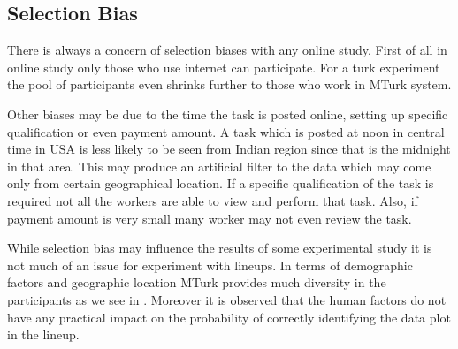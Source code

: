 \documentclass[11pt]{article}
\begin{document}

\subsection{Selection Bias} 


There is always a concern of selection biases with any online study. First of all in online study only those who use internet can participate. For a turk experiment the pool of participants even shrinks further to those who work in MTurk system. 

Other biases may be due to the time the task is posted online, setting up specific qualification or even payment amount. A task which is posted at noon in central time in USA is less likely to be seen from Indian region since that is the midnight in that area. This may produce an artificial filter to the data which may come only from certain geographical location. If a specific qualification of the task is required not all the workers are able to view and perform that task. Also, if payment amount is very small many worker may not even review the task.  

While selection bias may influence the results of some experimental study it is not much of an issue for experiment with lineups. In terms of demographic factors and geographic location MTurk provides much diversity in the participants as we see in \cite{majumder:socio}. Moreover it is observed that the human factors do not have any practical impact on the probability of correctly identifying the data plot in the lineup. 




\end{document}
